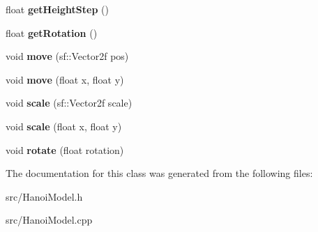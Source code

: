 \begin{DoxyCompactItemize}
float {\bfseries get\+Height\+Step} ()
\item 
\mbox{\label{class_hanoi_model_aeb881f19fe472158288d42367be8a974}} 
float {\bfseries get\+Rotation} ()
\item 
\mbox{\label{class_hanoi_model_acf764bef6d9ced086e515b7bec52c2ae}} 
void {\bfseries move} (sf\+::\+Vector2f pos)
\item 
\mbox{\label{class_hanoi_model_adcf5e787c20af0e6169a7b3267ce4ab9}} 
void {\bfseries move} (float x, float y)
\item 
\mbox{\label{class_hanoi_model_a491ba838418192fd7adee07040db7c5a}} 
void {\bfseries scale} (sf\+::\+Vector2f scale)
\item 
\mbox{\label{class_hanoi_model_a00f4f8d058952e935f29d5581c844ed0}} 
void {\bfseries scale} (float x, float y)
\item 
\mbox{\label{class_hanoi_model_a1076b0dcde19fbe8cc2c2f3ae3e709aa}} 
void {\bfseries rotate} (float rotation)
\end{DoxyCompactItemize}


The documentation for this class was generated from the following files\+:\begin{DoxyCompactItemize}
\item 
src/Hanoi\+Model.\+h\item 
src/Hanoi\+Model.\+cpp\end{DoxyCompactItemize}
